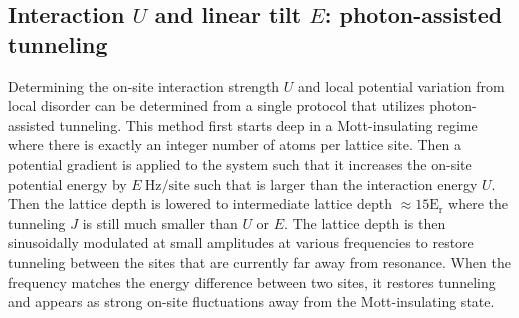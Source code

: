 \subsection{Interaction $U$ and linear tilt $E$: photon-assisted tunneling} \label{sec:EUcal}

Determining the on-site interaction strength $U$ and local potential variation from local disorder can be determined from a single protocol that utilizes photon-assisted tunneling\cite{Ma2011}. This method first starts deep in a Mott-insulating regime where there is exactly an integer number of atoms per lattice site. Then a potential gradient is applied to the system such that it increases the on-site potential energy by $E~\mathrm{Hz/site}$ such that is larger than the interaction energy $U$. Then the lattice depth is lowered to intermediate lattice depth $\approx 15 \mathrm{E_r}$ where the tunneling $J$ is still much smaller than $U$ or $E$. The lattice depth is then sinusoidally modulated at small amplitudes at various frequencies to restore tunneling between the sites that are currently far away from resonance. When the frequency matches the energy difference between two sites, it restores tunneling and appears as strong on-site fluctuations away from the Mott-insulating state.



